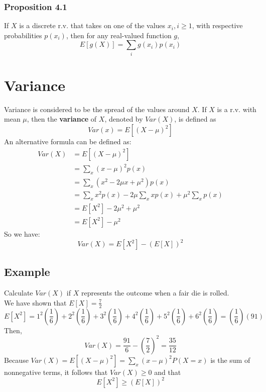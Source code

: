 \subsubsection*{Proposition 4.1}
If $X$ is a discrete r.v. that takes on one of the values $x_i, i\geq 1$, with respective probabilities $p(x_i)$, then for any real-valued function $g$, \[E[g(X)] = \sum_i g(x_i)p(x_i)\]
\section{Variance}
\begin{definition}[Variance]
    Variance is considered to be the spread of the values around $X$. If $X$ is a r.v. with mean $\mu$, then the \textbf{variance} of $X$, denoted by $Var(X)$, is defined as 
    \[Var(x) = E[(X-\mu)^2]\]
    An alternative formula can be defined as:
    \begin{equation*}
        \begin{split}
            Var(X) &= E[(X-\mu)^2]\\
            &= \sum_x (x-\mu)^2p(x)\\
            &= \sum_x (x^2 - 2\mu x + \mu^2)p(x)\\
            &= \sum_x x^2p(x) - 2\mu\sum_x xp(x) + \mu^2 \sum_x p(x)\\
            &= E[X^2] - 2\mu^2 + \mu^2\\
            &= E[X^2] - \mu^2
        \end{split}
    \end{equation*}
    So we have:
    \[Var(X) = E[X^2] - (E[X])^2\]
\end{definition}
\subsection*{Example}
Calculate $Var(X)$ if $X$ represents the outcome when a fair die is rolled. \\
We have shown that $E[X] = \frac{7}{2}$
\[E[X^2] = 1^2\left(\frac{1}{6}\right) + 2^2\left(\frac{1}{6}\right) + 3^2\left(\frac{1}{6}\right) + 4^2\left(\frac{1}{6}\right) + 5^2\left(\frac{1}{6}\right) + 6^2\left(\frac{1}{6}\right) = \left(\frac{1}{6}\right)(91)\]
Then, \[Var(X) = \frac{91}{6} - \left(\frac{7}{2}\right)^2 = \boxed{\frac{35}{12}}\]
Because $Var(X) = E[(X-\mu)^2] = \sum_x (x-\mu)^2 P(X = x)$ is the sum of nonnegative terms, it follows that $Var(X)\geq 0$ and that \[E[X^2]\geq (E[X])^2\]
